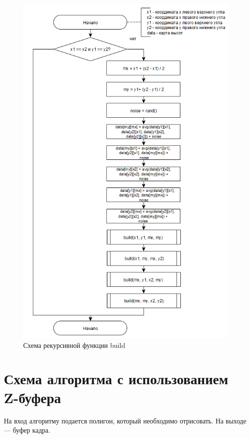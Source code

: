 \documentclass[a4paper, 14pt]{extreport}
\begin{document}
\begin{figure}[h]
	\centering
	\includegraphics[scale=1.1]{tools/alg_build.png}
	\caption{Схема рекурсивной функции build}
	\label{constr:build}
\end{figure}

\clearpage\section{Схема алгоритма с использованием Z-буфера}

На вход алгоритму подается полигон, который необходимо отрисовать. На выходе --- буфер кадра.
\end{document}
